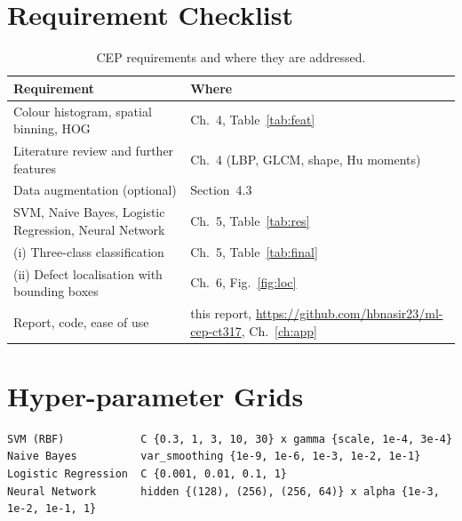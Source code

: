 \documentclass[11pt,a4paper]{report}
\newcommand{\repo}{\url{https://github.com/hbnasir23/ml-cep-ct317}}
\begin{document}
\appendix
\chapter{Requirement Checklist}
\begin{table}[H]
\centering
\caption{CEP requirements and where they are addressed.}
\begin{tabularx}{\textwidth}{Xl}
\toprule
Requirement & Where\\
\midrule
Colour histogram, spatial binning, HOG & Ch.~4, Table~\ref{tab:feat}\\
Literature review and further features & Ch.~4 (LBP, GLCM, shape, Hu moments)\\
Data augmentation (optional) & Section~4.3\\
SVM, Naive Bayes, Logistic Regression, Neural Network & Ch.~5, Table~\ref{tab:res}\\
(i) Three-class classification & Ch.~5, Table~\ref{tab:final}\\
(ii) Defect localisation with bounding boxes & Ch.~6, Fig.~\ref{fig:loc}\\
Report, code, ease of use & this report, \repo, Ch.~\ref{ch:app}\\
\bottomrule
\end{tabularx}
\end{table}

\chapter{Hyper-parameter Grids}
\begin{lstlisting}
SVM (RBF)            C {0.3, 1, 3, 10, 30} x gamma {scale, 1e-4, 3e-4}
Naive Bayes          var_smoothing {1e-9, 1e-6, 1e-3, 1e-2, 1e-1}
Logistic Regression  C {0.001, 0.01, 0.1, 1}
Neural Network       hidden {(128), (256), (256, 64)} x alpha {1e-3, 1e-2, 1e-1, 1}
\end{lstlisting}
\end{document}

